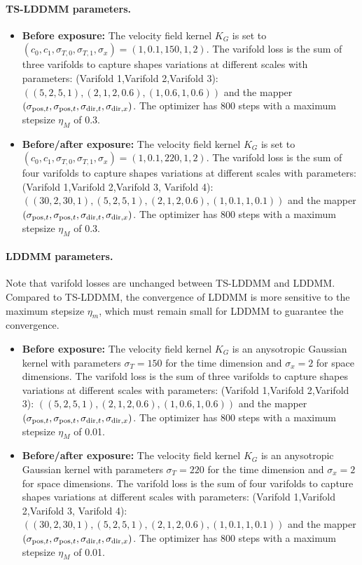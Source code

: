 \paragraph{TS-LDDMM parameters.}
\begin{itemize}
  \item \textbf{Before exposure:} The velocity field kernel $K_G$ is set to $ (c_0,c_1,\sigma_{T,0},\sigma_{T,1},\sigma_x) = (1,0.1,150,1,2)$. The varifold loss is the sum of three varifolds to capture shapes variations at different scales with parameters: (Varifold 1,Varifold 2,Varifold 3): $\left((5,2,5,1),(2,1,2,0.6),(1,0.6,1,0.6)\right)$ and the mapper $(\sigma_{\mathrm{pos},t}, \sigma_{\mathrm{pos},t}, \sigma_{\mathrm{dir},t}, \sigma_{\mathrm{dir},x})$. The optimizer has 800 steps with a maximum stepsize $\eta_M$ of 0.3.
  \item \textbf{Before/after exposure:} The velocity field kernel $K_G$ is set to $ (c_0,c_1,\sigma_{T,0},\sigma_{T,1},\sigma_x) = (1,0.1,220,1,2)$. The varifold loss is the sum of four varifolds to capture shapes variations at different scales with parameters: (Varifold 1,Varifold 2,Varifold 3, Varifold 4): $\left((30,2,30,1),(5,2,5,1),(2,1,2,0.6),(1,0.1,1,0.1)\right)$ and the mapper $(\sigma_{\mathrm{pos},t}, \sigma_{\mathrm{pos},t}, \sigma_{\mathrm{dir},t}, \sigma_{\mathrm{dir},x})$. The optimizer has 800 steps with a maximum stepsize $\eta_M$ of 0.3.
\end{itemize}

\paragraph{LDDMM parameters.} Note that varifold losses are unchanged between TS-LDDMM and LDDMM. Compared to TS-LDDMM, the convergence of LDDMM is more sensitive to the maximum stepsize $\eta_m$, which must remain small for LDDMM to guarantee the convergence.
\begin{itemize}
  \item \textbf{Before exposure:} The velocity field kernel $K_G$ is an anysotropic Gaussian kernel with parameters $\sigma_{T} =150$ for the time dimension and $\sigma_x = 2$ for space dimensions. 
  The varifold loss is the sum of three varifolds to capture shapes variations at different scales with parameters: (Varifold 1,Varifold 2,Varifold 3): $\left((5,2,5,1),(2,1,2,0.6),(1,0.6,1,0.6)\right)$ and the mapper $(\sigma_{\mathrm{pos},t}, \sigma_{\mathrm{pos},t}, \sigma_{\mathrm{dir},t}, \sigma_{\mathrm{dir},x})$. The optimizer has 800 steps with a maximum stepsize $\eta_M$ of 0.01.
  \item \textbf{Before/after exposure:} The velocity field kernel $K_G$ is an anysotropic Gaussian kernel with parameters $\sigma_{T} =220$ for the time dimension and $\sigma_x = 2$ for space dimensions.
  The varifold loss is the sum of four varifolds to capture shapes variations at different scales with parameters: (Varifold 1,Varifold 2,Varifold 3, Varifold 4): $\left((30,2,30,1),(5,2,5,1),(2,1,2,0.6),(1,0.1,1,0.1)\right)$ and the mapper $(\sigma_{\mathrm{pos},t}, \sigma_{\mathrm{pos},t}, \sigma_{\mathrm{dir},t}, \sigma_{\mathrm{dir},x})$. The optimizer has 800 steps with a maximum stepsize $\eta_M$ of 0.01.
\end{itemize}

